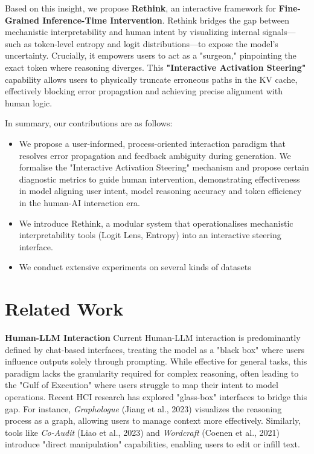 \documentclass{article}
\begin{document}
Based on this insight, we propose \textbf{Rethink}, an interactive framework for \textbf{Fine-Grained Inference-Time Intervention}. Rethink bridges the gap between mechanistic interpretability and human intent by visualizing internal signals—such as token-level entropy and logit distributions—to expose the model's uncertainty. Crucially, it empowers users to act as a "surgeon," pinpointing the exact token where reasoning diverges. This \textbf{"Interactive Activation Steering"} capability allows users to physically truncate erroneous paths in the KV cache, effectively blocking error propagation and achieving precise alignment with human logic.

In summary, our contributions are as follows:
\begin{itemize}
    \item We propose a user-informed, process-oriented interaction paradigm that resolves error propagation and feedback ambiguity during generation. We formalise the "Interactive Activation Steering" mechanism and propose certain diagnostic metrics to guide human intervention, demonstrating effectiveness in model aligning user intent, model reasoning accuracy and token efficiency in the human-AI interaction era.
    \item We introduce Rethink, a modular system that operationalises mechanistic interpretability tools (Logit Lens, Entropy) into an interactive steering interface.
    \item We conduct extensive experiments on several kinds of datasets
\end{itemize}


\section{Related Work}
\label{related}

\textbf{Human-LLM Interaction} \hspace{1mm}
Current Human-LLM interaction is predominantly defined by chat-based interfaces, treating the model as a "black box" where users influence outputs solely through prompting. While effective for general tasks, this paradigm lacks the granularity required for complex reasoning, often leading to the "Gulf of Execution" where users struggle to map their intent to model operations. Recent HCI research has explored "glass-box" interfaces to bridge this gap. For instance, \textit{Graphologue} (Jiang et al., 2023) visualizes the reasoning process as a graph, allowing users to manage context more effectively. Similarly, tools like \textit{Co-Audit} (Liao et al., 2023) and \textit{Wordcraft} (Coenen et al., 2021) introduce "direct manipulation" capabilities, enabling users to edit or infill text.
\end{document}
